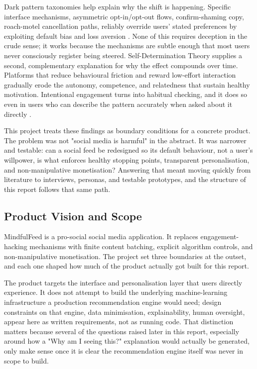 \documentclass[11pt]{article}
\begin{document}
Dark pattern taxonomies help explain why the shift is happening. Specific interface mechanisms, asymmetric opt-in/opt-out flows, confirm-shaming copy, roach-motel cancellation paths, reliably override users' stated preferences by exploiting default bias and loss aversion \parencites[2]{4807303}. None of this requires deception in the crude sense; it works because the mechanisms are subtle enough that most users never consciously register being steered. Self-Determination Theory supplies a second, complementary explanation for why the effect compounds over time. Platforms that reduce behavioural friction and reward low-effort interaction gradually erode the autonomy, competence, and relatedness that sustain healthy motivation. Intentional engagement turns into habitual checking, and it does so even in users who can describe the pattern accurately when asked about it directly \parencites[8]{2404919}.

This project treats these findings as boundary conditions for a concrete product. The problem was not "social media is harmful" in the abstract. It was narrower and testable: can a social feed be redesigned so its default behaviour, not a user's willpower, is what enforces healthy stopping points, transparent personalisation, and non-manipulative monetisation? Answering that meant moving quickly from literature to interviews, personas, and testable prototypes, and the structure of this report follows that same path.

\subsection{Product Vision and Scope}
MindfulFeed is a pro-social social media application. It replaces engagement-hacking mechanisms with finite content batching, explicit algorithm controls, and non-manipulative monetisation. The project set three boundaries at the outset, and each one shaped how much of the product actually got built for this report.

The product targets the interface and personalisation layer that users directly experience. It does not attempt to build the underlying machine-learning infrastructure a production recommendation engine would need; design constraints on that engine, data minimisation, explainability, human oversight, appear here as written requirements, not as running code. That distinction matters because several of the questions raised later in this report, especially around how a "Why am I seeing this?" explanation would actually be generated, only make sense once it is clear the recommendation engine itself was never in scope to build.
\end{document}
